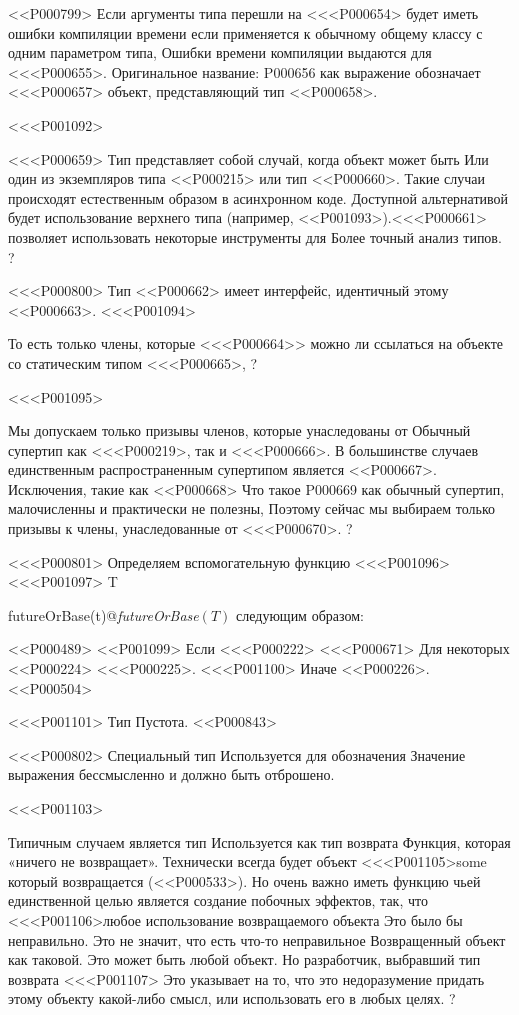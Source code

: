 {{{{{{{{{{{{{{{{{<<P000799>%
Если аргументы типа перешли на <<<P000654> будет иметь ошибки компиляции времени
если применяется к обычному общему классу с одним параметром типа,
Ошибки времени компиляции выдаются для <<<P000655>.
Оригинальное название: P000656 как выражение
обозначает <<<P000657> объект, представляющий тип <<P000658>.

<<<P001092>{%
<<<P000659> Тип представляет собой случай, когда объект может быть
Или один из экземпляров типа <<P000215>
или тип <<P000660>.
Такие случаи происходят естественным образом в асинхронном коде.
Доступной альтернативой будет использование верхнего типа (например, <<P001093>).<<<P000661> позволяет использовать некоторые инструменты для
Более точный анализ типов.%
?

<<<P000800>%
Тип <<P000662> имеет интерфейс, идентичный этому
<<P000663>.
<<<P001094>{%
То есть только члены, которые <<<P000664>> можно ли ссылаться
на объекте со статическим типом <<<P000665>,%
?

<<<P001095>{%
Мы допускаем только призывы членов, которые унаследованы от
Обычный супертип как <<<P000219>, так и <<<P000666>.
В большинстве случаев единственным распространенным супертипом является <<P000667>.
Исключения, такие как <<P000668>
Что такое P000669 как обычный супертип,
малочисленны и практически не полезны,
Поэтому сейчас мы выбираем только призывы к
члены, унаследованные от <<<P000670>.%
?

<<<P000801>%
Определяем вспомогательную функцию
<<<P001096><<<P001097> T}}{futureOrBase(t)@\emph{futureOrBase}$(T)$}
следующим образом:

<<P000489>
<<P001099> Если <<<P000222> <<<P000671> Для некоторых <<P000224>
<<<P000225>.
<<<P001100> Иначе <<P000226>.
<<P000504>


<<<P001101> Тип Пустота.
<<P000843>

<<<P000802>%
Специальный тип \VOID{} Используется для обозначения
Значение выражения бессмысленно и должно быть отброшено.

<<<P001103>{%
Типичным случаем является тип \VOID{} Используется как тип возврата
Функция, которая «ничего не возвращает».
Технически всегда будет объект <<<P001105>{some}
который возвращается
(<<P000533>).
Но очень важно иметь функцию
чьей единственной целью является создание побочных эффектов,
так, что <<<P001106>{любое} использование возвращаемого объекта
Это было бы неправильно.
%
Это не значит, что есть что-то неправильное
Возвращенный объект как таковой.
Это может быть любой объект.
Но разработчик, выбравший тип возврата <<<P001107>
Это указывает на то, что это недоразумение
придать этому объекту какой-либо смысл,
или использовать его в любых целях.%
?

}}}}}}}}}}}}}}}}}}}
